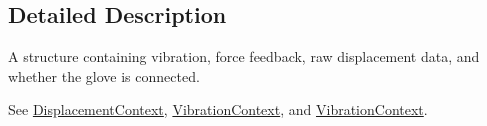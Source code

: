 \subsection{Detailed Description}
A structure containing vibration, force feedback, raw displacement data, and whether the glove is connected. 

See {\ttfamily \hyperlink{struct_displacement_context}{Displacement\+Context}}, {\ttfamily \hyperlink{struct_vibration_context}{Vibration\+Context}}, and {\ttfamily \hyperlink{struct_vibration_context}{Vibration\+Context}}. 